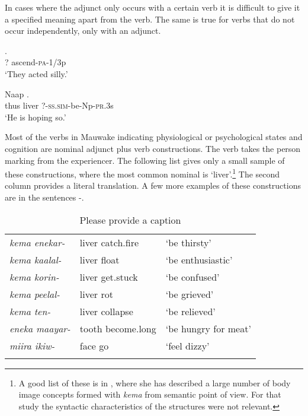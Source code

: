 In cases where the adjunct only occurs with a certain verb it is difficult to give it a specified meaning apart from the verb. The same is true for verbs that do not occur independently, only with an adjunct.

\ea%
\label{ex:3:x454}
\gll {} . \\
? ascend-\textsc{pa}-1/3p\\
\glt`They acted silly.'
\z

\ea%
\label{ex:3:x455}
\gll Naap  . \\
thus liver ?-\textsc{ss}.\textsc{sim}-be-Np-\textsc{pr}.3s\\
\glt`He is hoping so.'
\z

Most of the verbs in Mauwake indicating physiological or psychological states and cognition are nominal adjunct plus verb constructions. The verb takes the person marking from the experiencer. The following list gives only a small sample of these constructions, where the most common nominal is  `liver'.\footnote{A good list of these is in \citet[47--63]{Kwan1989}, where she has described a large number of body image concepts formed with \textit{kema} from semantic point of view. For that study the syntactic characteristics of the structures were not relevant.} The second column provides a literal translation. A few more examples of these constructions are in the sentences -.

\begin{table}
\begin{tabular}{>{\it}lll}
\mytoprule
kema enekar- &liver catch.fire &`be thirsty'\\
kema kaalal- &liver float &`be enthusiastic'\\
kema korin- &liver get.stuck &`be confused'\\
kema peelal- &liver rot &`be grieved'\\
kema ten- &liver collapse &`be relieved'\\
eneka maayar- &tooth become.long &`be hungry for meat'\\
miira ikiw- &face go &`feel dizzy'\\
\mybottomrule 
\end{tabular}
\caption{Please provide a caption}
\label{tab:3:nominaladjunctplusverbconstrucion}
\end{table}


